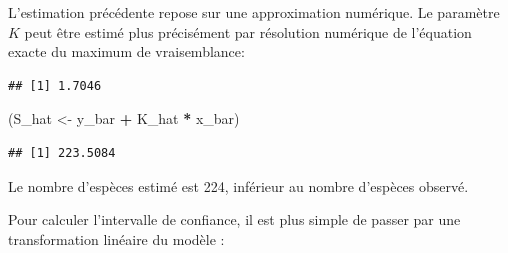 \documentclass[
  11pt,
  american,
  a4paper,
  extrafontsizes,onecolumn,openright
  ]{memoir}
\newenvironment{Shaded}{\begin{snugshade}}{\end{snugshade}}
\newcommand{\CommentTok}[1]{\textcolor[rgb]{0.56,0.35,0.01}{\textit{#1}}}
\newcommand{\ControlFlowTok}[1]{\textcolor[rgb]{0.13,0.29,0.53}{\textbf{#1}}}
\newcommand{\DecValTok}[1]{\textcolor[rgb]{0.00,0.00,0.81}{#1}}
\newcommand{\FloatTok}[1]{\textcolor[rgb]{0.00,0.00,0.81}{#1}}
\newcommand{\FunctionTok}[1]{\textcolor[rgb]{0.13,0.29,0.53}{\textbf{#1}}}
\newcommand{\NormalTok}[1]{#1}
\newcommand{\OtherTok}[1]{\textcolor[rgb]{0.56,0.35,0.01}{#1}}
\newcommand{\SpecialCharTok}[1]{\textcolor[rgb]{0.81,0.36,0.00}{\textbf{#1}}}
\begin{document}
L'estimation précédente repose sur une approximation numérique.
Le paramètre \(K\) peut être estimé plus précisément par résolution numérique de l'équation exacte du maximum de vraisemblance:

\scriptsize

\begin{Shaded}
\end{Shaded}

\begin{verbatim}
## [1] 1.7046
\end{verbatim}

\begin{Shaded}
\begin{Highlighting}[]
\NormalTok{(S\_hat }\OtherTok{\textless{}{-}}\NormalTok{ y\_bar }\SpecialCharTok{+}\NormalTok{ K\_hat }\SpecialCharTok{*}\NormalTok{ x\_bar)}
\end{Highlighting}
\end{Shaded}

\begin{verbatim}
## [1] 223.5084
\end{verbatim}

\normalsize

Le nombre d'espèces estimé est 224, inférieur au nombre d'espèces observé.

Pour calculer l'intervalle de confiance, il est plus simple de passer par une transformation linéaire du modèle \autocite{Lineweaver1934}:
\end{document}
